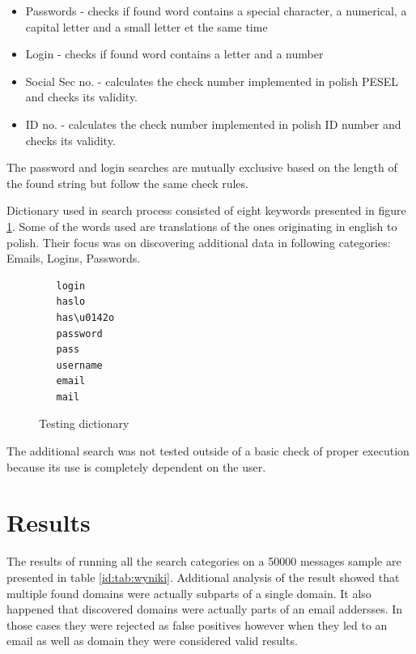 \documentclass[a4paper,twoside,12pt]{book}
\begin{document}
\begin{itemize}
   \item Passwords - checks if found word contains a special character, a numerical, a capital letter and a small letter et the same time
   \item Login - checks if found word contains a letter and a number
   \item Social Sec no. - calculates the check number implemented in polish PESEL and checks its validity.
   \item ID no. - calculates the check number implemented in polish ID number and checks its validity.
\end{itemize}

The password and login searches are mutually exclusive based on the length of the found string but follow the same
check rules.

Dictionary used in search process consisted of eight keywords presented in figure \ref{fig:dictionary}. 
Some of the words used are translations of the ones originating in english to polish. Their focus was on discovering
additional data in following categories: Emails, Logins, Passwords.

\begin{figure}
   \centering
   \begin{lstlisting}
   login
   haslo
   has\u0142o
   password
   pass
   username
   email
   mail
   \end{lstlisting}
   \caption{Testing dictionary}
   \label{fig:dictionary}
\end{figure}

The additional search was not tested outside of a basic check of proper execution because its use is completely dependent on the user.

\section{Results}

The results of running all the search categories on a 50000 messages sample are presented in table \ref{id:tab:wyniki}.
Additional analysis of the result showed that multiple found domains were actually subparts of a single
domain. It also happened that discovered domains were actually parts of an email addersses. In those cases
they were rejected as false positives however when they led to an email as well as domain they 
were considered valid results. 
\end{document}
